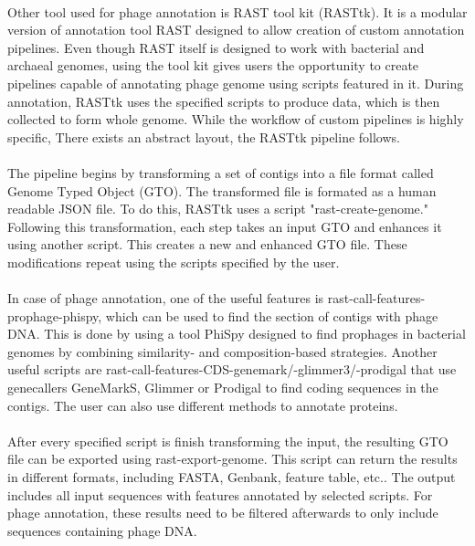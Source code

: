 \paragraph*{}
Other tool used for phage annotation is RAST tool kit (RASTtk). It is a modular version of annotation tool RAST designed to allow creation of custom annotation pipelines. Even though RAST itself is designed to work with bacterial and archaeal genomes, using the tool kit gives users the opportunity to create pipelines capable of annotating phage genome using scripts featured in it. During annotation, RASTtk uses the specified scripts to produce data, which is then collected to form whole genome. While the workflow of custom pipelines is highly specific, There exists an abstract layout, the RASTtk pipeline follows.
\paragraph*{}
The pipeline begins by transforming a set of contigs into a file format called Genome Typed Object (GTO). The transformed file is formated as a human readable JSON file. To do this, RASTtk uses a script "rast-create-genome." Following this transformation, each step takes an input GTO and enhances it using another script. This creates a new and enhanced GTO file. These modifications repeat using the scripts specified by the user.
\paragraph*{}
In case of phage annotation, one of the useful features is rast-call-features-prophage-phispy, which can be used to find the section of contigs with phage DNA. This is done by using a tool PhiSpy designed to find prophages in bacterial genomes by combining similarity- and composition-based strategies. Another useful scripts are rast-call-features-CDS-genemark/-glimmer3/-prodigal that use genecallers GeneMarkS, Glimmer or Prodigal to find coding sequences in the contigs. The user can also use different methods to annotate proteins.
\paragraph*{}
After every specified script is finish transforming the input, the resulting GTO file can be exported using rast-export-genome. This script can return the results in different formats, including FASTA, Genbank, feature table, etc.. The output includes all input sequences with features annotated by selected scripts. For phage annotation, these results need to be filtered afterwards to only include sequences containing phage DNA.
